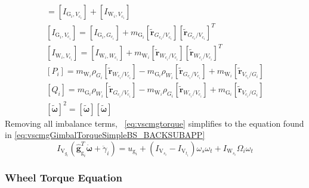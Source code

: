 \begin{gather}
[I_{\text{V}_i,V_{c_i}}] = [I_{\text{G}_i,V_{c_i}}] + [I_{\text{W}_i,V_{c_i}}]
\\
[I_{\text{G}_i,V_{c_i}}] = [I_{\text{G}_i,G_{c_i}}] + m_{\text{G}_i}[\tilde{\bm{r}}_{G_{c_i}/V_{c_i}}][\tilde{\bm{r}}_{G_{c_i}/V_{c_i}}]^T
\\
[I_{\text{W}_i,V_{c_i}}] = [I_{\text{W}_i,W_{c_i}}] + m_{\text{W}_i}[\tilde{\bm{r}}_{W_{c_i}/V_{c_i}}][\tilde{\bm{r}}_{W_{c_i}/V_{c_i}}]^T
\\
[P_i] = m_{\text{W}_i}\rho_{G_i}[\tilde{\bm{r}}_{W_{c_i}/V_{c_i}}] - m_{\text{G}_i}\rho_{W_i}[\tilde{\bm{r}}_{G_{c_i}/V_{c_i}}] + m_{\text{W}_i}[\tilde{\bm r}_{V_{c_i}/G_i}]
\\
[Q_i] = m_{\text{G}_i}\rho_{W_i}[\tilde{\bm{r}}_{G_{c_i}/V_{c_i}}] - m_{\text{W}_i}\rho_{G_i}[\tilde{\bm{r}}_{W_{c_i}/V_{c_i}}] + m_{\text{G}_i}[\tilde{\bm r}_{V_{c_i}/G_i}]
\\
[\tilde{\bm\omega}]^2 = [\tilde{\bm\omega}][\tilde{\bm\omega}]
\end{gather}
Removing all imbalance terms, ~\eqref{eq:vscmgtorque} simplifies to the equation found in \eqref{eq:vscmgGimbalTorqueSimpleBS_BACKSUBAPP}
\begin{equation}
I_{\text{V}_{g_i}}(\hat{\bm g}_{\text{g}_i}^T\dot{\bm{\omega}}
+  \ddot{\gamma}_i)
 = u_{\text{g}_i} + (I_{\text{V}_{s_i}}-I_{\text{V}_{t_i}})\omega_s\omega_t + I_{\text{W}_{s_i}}\Omega_i\omega_t
\label{eq:vscmgGimbalTorqueSimple}
\end{equation}

\subsubsection{Wheel Torque Equation}

